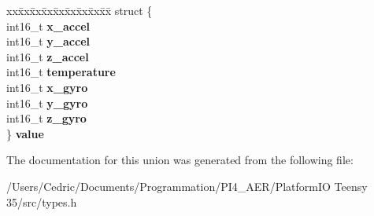 \begin{DoxyCompactItemize}
\begin{tabbing}
\end{tabbing}\item 
\mbox{\label{unionaccel__temp__gyro__t_a405f6afe02beafda3201da027f76b0e8}} 
\begin{tabbing}
xx\=xx\=xx\=xx\=xx\=xx\=xx\=xx\=xx\=\kill
struct \{\\
\>int16\_t {\bfseries x\_accel}\\
\>int16\_t {\bfseries y\_accel}\\
\>int16\_t {\bfseries z\_accel}\\
\>int16\_t {\bfseries temperature}\\
\>int16\_t {\bfseries x\_gyro}\\
\>int16\_t {\bfseries y\_gyro}\\
\>int16\_t {\bfseries z\_gyro}\\
\} {\bfseries value}\\

\end{tabbing}\end{DoxyCompactItemize}


The documentation for this union was generated from the following file\+:\begin{DoxyCompactItemize}
\item 
/\+Users/\+Cedric/\+Documents/\+Programmation/\+P\+I4\+\_\+\+A\+E\+R/\+Platform\+I\+O Teensy 35/src/types.\+h\end{DoxyCompactItemize}
